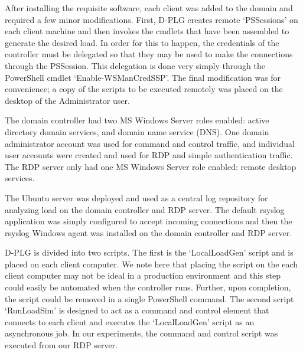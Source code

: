 After installing the requisite software, each client was added to the domain
and required a few minor modifications.  First, D-PLG creates remote
`PSSessions' on each client machine and then invokes the cmdlets that have been
assembled to generate the desired load.  In order for this to happen, the
credentials of the controller must be delegated so that they may be used to
make the connections through the PSSession.  This delegation is done very
simply through the PowerShell cmdlet `Enable-WSManCredSSP'.  The final
modification was for convenience; a copy of the scripts to be executed remotely
was placed on the desktop of the Administrator user.

The domain controller had two MS Windows Server roles enabled: active directory
domain services, and domain name service (DNS).  One domain administrator
account was used for command and control traffic, and individual user accounts
were created and used for RDP and simple authentication traffic.  The RDP
server only had one MS Windows Server role enabled: remote desktop services.

The Ubuntu server was deployed and used as a central log repository for
analyzing load on the domain controller and RDP server.  The default rsyslog
application was simply configured to accept incoming connections and then the
rsyslog Windows agent was installed on the domain controller and RDP server.

D-PLG is divided into two scripts.  The first is the `LocalLoadGen' script
and is placed on each client computer.  We note here that placing the script on
the each client computer may not be ideal in a production environment and this
step could easily be automated when the controller runs.  Further, upon
completion, the script could be removed in a single PowerShell command.  The
second script `RunLoadSim' is designed to act as a command and control element
that connects to each client and executes the `LocalLoadGen' script as an
asynchronous job.  In our experiments, the command and control script was
executed from our RDP server. 

